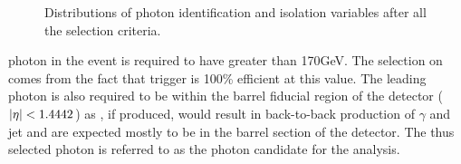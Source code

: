\begin{figure}[h!]
 \caption{Distributions of photon identification and isolation variables after all the selection criteria.}
 \label{fig:photonIsolation}
\end{figure}
%
%
photon in the event is required to have \pt greater than 170\unit{GeV}. The selection on \pt comes from the fact that trigger is 100\% 
efficient at this value. The leading photon is also required to be within the barrel fiducial region of the detector ($\lvert \eta \rvert<1.4442$) as 
\qstar, if produced, would result in back-to-back production of $\gamma$ and jet and are expected mostly to be in the barrel section of the detector. 
The thus selected photon is referred to as the photon candidate for the analysis. 

